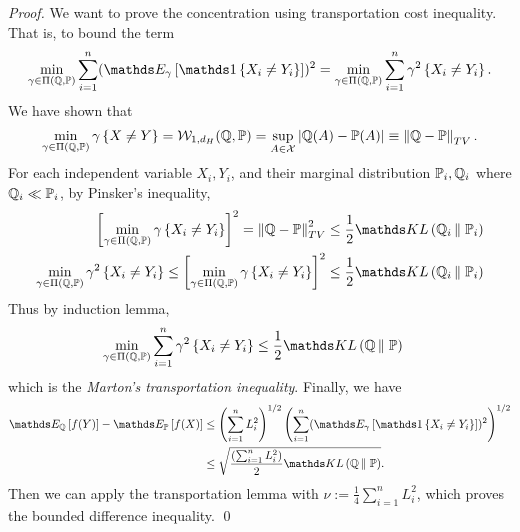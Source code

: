 \documentclass[11pt]{article}
\begin{document}
\begin{itemize}
\begin{proof}
We want to prove the concentration using transportation cost inequality. That is, to bound the term
\begin{align*}
\min_{\gamma \in \Pi(\bQ, \bP)}\sum_{i=1}^{n}(\E{\gamma}{\ind{X_i \neq Y_i}})^2 = \min_{\gamma \in \Pi(\bQ, \bP)}\sum_{i=1}^{n}\gamma^2\set{X_i \neq Y_i}.
\end{align*} We have shown that 
\begin{align*}
\min_{\gamma \in \Pi({\mathbb Q}, {\mathbb P})}\gamma\left\{X \neq Y\right\} = {\mathcal W}_{1, d_H}({\mathbb Q}, {\mathbb P}) = \sup_{A \in {\mathcal X}}\left\lvert {\mathbb Q}(A) - {\mathbb P}(A) \right\rvert  \equiv \left\|{\mathbb Q} - {\mathbb P}\right\|_{TV}.
\end{align*}  For each independent variable $X_i, Y_i$, and their marginal distribution ${\mathbb P}_i, {\mathbb Q}_i$ where ${\mathbb Q}_i \ll {\mathbb P}_i$, by Pinsker's inequality,
\begin{align*}
 \brac{\min_{\gamma \in \Pi(\bQ, \bP)}\gamma\set{X_i \neq Y_i}}^2 = \norm{\bQ - \bP}{TV}^2 &\le \frac{1}{2}\kl{\bQ_i}{\bP_i} \\
\min_{\gamma \in \Pi(\bQ, \bP)} \gamma^2\set{X_i \neq Y_i} \le \brac{\min_{\gamma \in \Pi(\bQ, \bP)}\gamma\set{X_i \neq Y_i}}^2 &\le \frac{1}{2}\kl{\bQ_i}{\bP_i}
\end{align*} Thus by induction lemma, 
\begin{align*}
\min_{\gamma \in \Pi(\bQ, \bP)}\sum_{i=1}^{n}\gamma^2\set{X_i \neq Y_i} &\le \frac{1}{2}\kl{\bQ}{\bP}
\end{align*} which is the \emph{Marton's transportation inequality}. Finally, we have
\begin{align*}
\E{\bQ}{f(Y)} - \E{\bP}{f(X)} &\le \paren{\sum_{i=1}^{n}L_i^2}^{1/2}\paren{\sum_{i=1}^{n}(\E{\gamma}{\ind{X_i \neq Y_i}})^2}^{1/2} \\
&\le \sqrt{\frac{\paren{\sum_{i=1}^{n}L_i^2}}{2}\kl{\bQ}{\bP}}.
\end{align*} Then we can apply the transportation lemma with $\nu := \frac{1}{4}\sum_{i=1}^{n}L_i^2$, which proves the bounded difference inequality. \qed 
\end{proof}
\end{itemize}





\newpage


\end{document}
